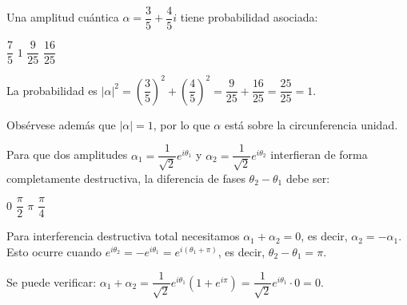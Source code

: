 \begin{questions}
  \question Una amplitud cuántica $\alpha = \dfrac{3}{5} + \dfrac{4}{5}i$ tiene probabilidad asociada:

  \begin{choices}
    \choice $\dfrac{7}{5}$
    \CorrectChoice $1$
    \choice $\dfrac{9}{25}$
    \choice $\dfrac{16}{25}$
  \end{choices}
  \begin{solution}
    La probabilidad es $|\alpha|^2 = \left(\dfrac{3}{5}\right)^2 + \left(\dfrac{4}{5}\right)^2 = \dfrac{9}{25} + \dfrac{16}{25} = \dfrac{25}{25} = 1$.

    Obsérvese además que $|\alpha|=1$, por lo que $\alpha$ está sobre la circunferencia unidad.
  \end{solution}

  \question Para que dos amplitudes $\alpha_1 = \dfrac{1}{\sqrt{2}}e^{i\theta_1}$ y $\alpha_2 = \dfrac{1}{\sqrt{2}}e^{i\theta_2}$ interfieran de forma completamente destructiva, la diferencia de fases $\theta_2-\theta_1$ debe ser:

  \begin{choices}
    \choice $0$
    \choice $\dfrac{\pi}{2}$
    \CorrectChoice $\pi$
    \choice $\dfrac{\pi}{4}$
  \end{choices}
  \begin{solution}
    Para interferencia destructiva total necesitamos $\alpha_1 + \alpha_2 = 0$, es decir, $\alpha_2 = -\alpha_1$. Esto ocurre cuando $e^{i\theta_2} = -e^{i\theta_1} = e^{i(\theta_1+\pi)}$, es decir, $\theta_2 - \theta_1 = \pi$.

    Se puede verificar: $\alpha_1+\alpha_2 = \dfrac{1}{\sqrt{2}}e^{i\theta_1}(1+e^{i\pi}) = \dfrac{1}{\sqrt{2}}e^{i\theta_1}\cdot 0 = 0$.
  \end{solution}

\end{questions}